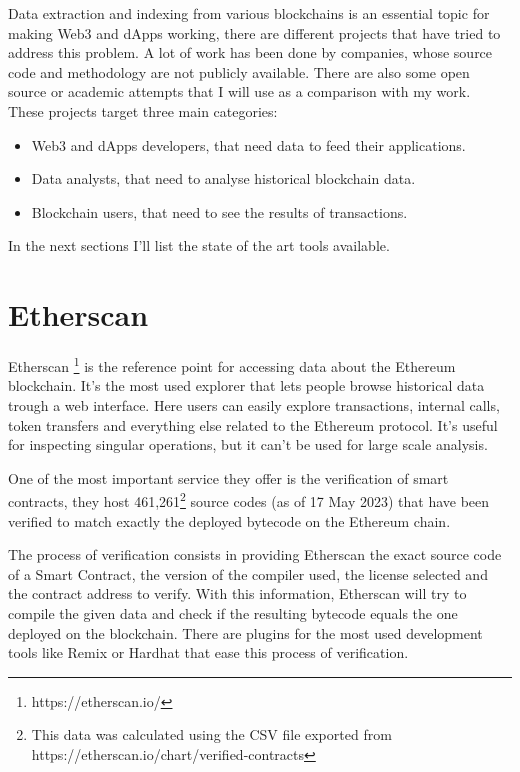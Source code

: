 
Data extraction and indexing from various blockchains is an essential topic for making Web3 and dApps working, there are different projects that have tried to address this problem. A lot of work has been done by companies, whose source code and methodology are not publicly available. There are also some open source or academic attempts that I will use as a comparison with my work. \\

\noindent These projects target three main categories:

\begin{itemize}
  \item Web3 and dApps developers, that need data to feed their applications.
  \item Data analysts, that need to analyse historical blockchain data. 
  \item Blockchain users, that need to see the results of transactions.
\end{itemize}

\noindent In the next sections I'll list the state of the art tools available.

\section{Etherscan}

Etherscan \footnote{https://etherscan.io/} is the reference point for accessing data about the Ethereum blockchain. It’s the most used explorer that lets people browse historical data trough a web interface. Here users can easily explore transactions, internal calls, token transfers and everything else related to the Ethereum protocol. It’s useful for inspecting singular operations, but it can’t be used for large scale analysis.

One of the most important service they offer is the verification of smart contracts, they host 461,261\footnote{This data was calculated using the CSV file exported from https://etherscan.io/chart/verified-contracts} source codes (as of 17 May 2023) that have been verified to match exactly the deployed bytecode on the  Ethereum chain. 

The process of verification consists in providing Etherscan the exact source code of a Smart Contract, the version of the compiler used, the license selected and the contract address to verify. With this information, Etherscan will try to compile the given data and check if the resulting bytecode equals the one deployed on the blockchain. There are plugins for the most used development tools like Remix or Hardhat that ease this process of verification.

